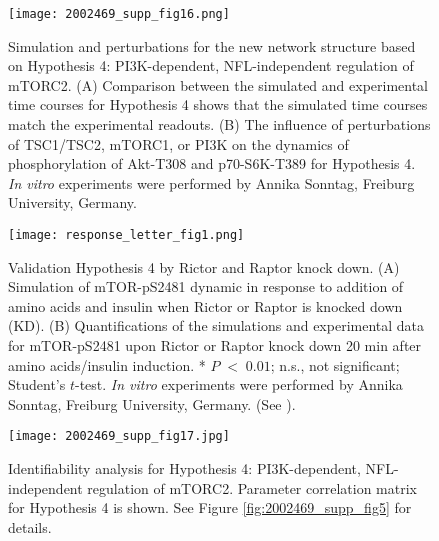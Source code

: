 \begin{figure}[tb]
	\begin{center}
		\texttt{[image: 2002469\_supp\_fig16.png]}
		\caption[Simulation and perturbations for the new network structure based on Hypothesis 4: PI3K-dependent, NFL-independent regulation of mTORC2]{Simulation and perturbations for the new network structure based on Hypothesis 4: PI3K-dependent, NFL-independent regulation of mTORC2. (A) Comparison between the simulated and experimental time courses for Hypothesis 4 shows that the simulated time courses match the experimental readouts. (B) The influence of perturbations of TSC1/TSC2, mTORC1, or PI3K on the dynamics of phosphorylation of Akt-T308 and p70-S6K-T389 for Hypothesis 4. \emph{In vitro} experiments were performed by Annika Sonntag, Freiburg University, Germany.}
		\label{fig:2002469_supp_fig16}
	\end{center}
\end{figure}
\clearpage

\begin{figure}[tb]
	\begin{center}
		\texttt{[image: response\_letter\_fig1.png]}
		\caption[Validation Hypothesis 4 by Rictor and Raptor knock down.]{Validation Hypothesis 4 by Rictor and Raptor knock down. (A) Simulation of mTOR-pS2481 dynamic in response to addition of amino acids and insulin when Rictor or Raptor is knocked down (KD). (B) Quantifications of the simulations and experimental data for mTOR-pS2481 upon Rictor or Raptor knock down 20 min after amino acids/insulin induction. * $P\;<\;0.01$; n.s., not significant; Student's $t$-test. \emph{In vitro} experiments were performed by Annika Sonntag, Freiburg University, Germany. (See \citep[Fig. 1]{DallePezze2012b}).}
		\label{fig:response_letter_fig1}
	\end{center}
\end{figure}
\clearpage

\begin{figure}[tb]
	\begin{center}
		\texttt{[image: 2002469\_supp\_fig17.jpg]}
		\caption[Identifiability analysis for Hypothesis 4: PI3K-dependent, NFL-independent regulation of mTORC2]{Identifiability analysis for Hypothesis 4: PI3K-dependent, NFL-independent regulation of mTORC2. Parameter correlation matrix for Hypothesis 4 is shown. See Figure \ref{fig:2002469_supp_fig5} for details.}
		\label{fig:2002469_supp_fig17}
	\end{center}
\end{figure}
\clearpage

